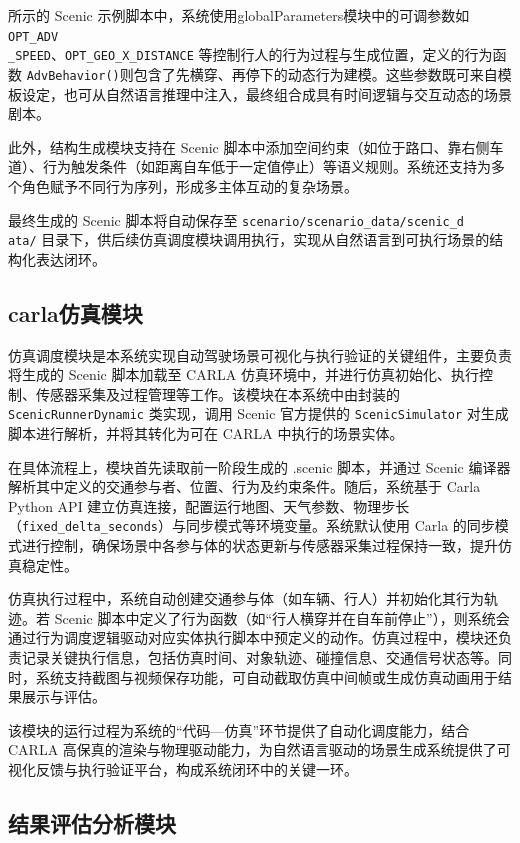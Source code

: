  所示的 Scenic 示例脚本中，系统使用globalParameters模块中的可调参数如
 \texttt{OPT\_ADV\\ \_SPEED}、\texttt{OPT\_GEO\_X\_DISTANCE} 等控制行人的行为过程与生成位置，定义的行为函数 \texttt{AdvBehavior()}则包含了先横穿、再停下的动态行为建模。这些参数既可来自模板设定，也可从自然语言推理中注入，最终组合成具有时间逻辑与交互动态的场景剧本。

此外，结构生成模块支持在 Scenic 脚本中添加空间约束（如位于路口、靠右侧车道）、行为触发条件（如距离自车低于一定值停止）等语义规则。系统还支持为多个角色赋予不同行为序列，形成多主体互动的复杂场景。

最终生成的 Scenic 脚本将自动保存至 \texttt{scenario/scenario\_data/scenic\_d\\ata/} 目录下，供后续仿真调度模块调用执行，实现从自然语言到可执行场景的结构化表达闭环。

\subsection{carla仿真模块}

仿真调度模块是本系统实现自动驾驶场景可视化与执行验证的关键组件，主要负责将生成的 Scenic 脚本加载至 CARLA 仿真环境中，并进行仿真初始化、执行控制、传感器采集及过程管理等工作。该模块在本系统中由封装的 \texttt{ScenicRunnerDynamic} 类实现，调用 Scenic 官方提供的 \texttt{ScenicSimulator} 对生成脚本进行解析，并将其转化为可在 CARLA 中执行的场景实体。

在具体流程上，模块首先读取前一阶段生成的 .scenic 脚本，并通过 Scenic 编译器解析其中定义的交通参与者、位置、行为及约束条件。随后，系统基于 Carla Python API 建立仿真连接，配置运行地图、天气参数、物理步长（\texttt{fixed\_delta\_seconds}）与同步模式等环境变量。系统默认使用 Carla 的同步模式进行控制，确保场景中各参与体的状态更新与传感器采集过程保持一致，提升仿真稳定性。

仿真执行过程中，系统自动创建交通参与体（如车辆、行人）并初始化其行为轨迹。若 Scenic 脚本中定义了行为函数（如“行人横穿并在自车前停止”），则系统会通过行为调度逻辑驱动对应实体执行脚本中预定义的动作。仿真过程中，模块还负责记录关键执行信息，包括仿真时间、对象轨迹、碰撞信息、交通信号状态等。同时，系统支持截图与视频保存功能，可自动截取仿真中间帧或生成仿真动画用于结果展示与评估。

该模块的运行过程为系统的“代码—仿真”环节提供了自动化调度能力，结合 CARLA 高保真的渲染与物理驱动能力，为自然语言驱动的场景生成系统提供了可视化反馈与执行验证平台，构成系统闭环中的关键一环。

\subsection{结果评估分析模块}

